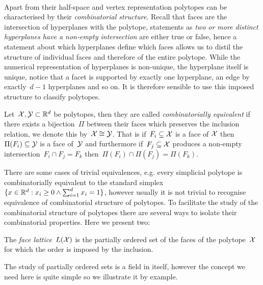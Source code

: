 %
\\[1em]
%
\mysplit Apart from their half-space and vertex representation polytopes can be characterised by their \emph{combinatorial structure}. 
%
Recall that faces are the intersection of hyperplanes with the polytope, statements as \emph{two or more distinct hyperplanes have a non-empty intersection} are either true or false, hence a statement about which hyperplanes define which faces allows us to distil the structure of individual faces and therefore of the entire polytope.
%
While the numerical representation of hyperplanes is non-unique, the hyperplane itself is unique, notice that a facet is supported by exactly one hyperplane, an edge by exactly~$d-1$ hyperplanes and so on. 
%
It is therefore sensible to use this imposed structure to classify polytopes.
%
\begin{defi}
Let~$\mathcal X,\mathcal Y\subset\mathbb R^d$ be polytopes, then they are called \emph{combinatorially equivalent} if there exists a bijection~$\Pi$ between their faces which preserves the inclusion relation, we denote this by~$\mathcal X\cong\mathcal Y$.
%
That is if~$F_i\subseteq\mathcal X$ is a face of $\mathcal X$ then $\Pi(F_i)\subseteq\mathcal Y$ is a face of~$\mathcal Y$ and furthermore if~$F_j\subseteq\mathcal X$ produces a non-empty intersection~$F_i\cap F_j=F_k$ then~$\Pi(F_i)\cap\Pi(F_j)=\Pi(F_k)$.
\end{defi}
%
\noindent There are some cases of trivial equivalences, e.g. every simplicial polytope is combinatorially equivalent to the standard simplex~$\{x\in\mathbb R^d:x_i\geq0\wedge\sum_{i=1}^d x_i=1\}$, however usually it is not trivial to recognise equivalence of combinatorial structure of polytopes.
%
To facilitate the study of the combinatorial structure of polytopes there are several ways to isolate their combinatorial properties.
%
Here we present two:
%
\begin{defi}
The \emph{face lattice}~$L(\mathcal X)$ is the partially ordered set of the faces of the polytope~$\mathcal X$ for which the order is imposed by the inclusion.
\end{defi}
%
\noindent The study of partially ordered sets is a field in itself, however the concept we need here is quite simple so we illustrate it by example.
%
